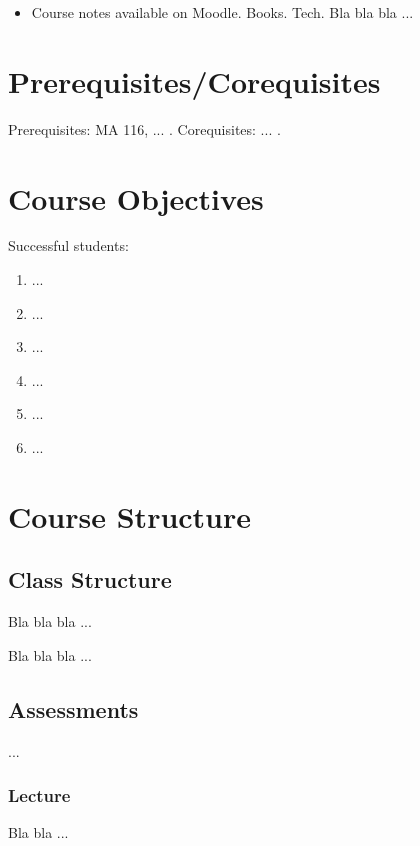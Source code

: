 \documentclass[11pt]{article}
\begin{document}
\begin{itemize}
\item Course notes available on Moodle. Books. Tech. Bla bla bla ...
\end{itemize}


\section*{Prerequisites/Corequisites}
Prerequisites: MA 116, ... .  Corequisites: ... .


\section*{Course Objectives}
Successful students:
\begin{enumerate}
\item ...
\item ...
\item ...
\item ...
\item ...
\item ...
\end{enumerate}


\section*{Course Structure}

\subsection*{Class Structure}

Bla bla bla ...

\bigskip

Bla bla bla ...

\subsection*{Assessments}

...

\subsubsection*{Lecture}
Bla bla ...
\end{document}
